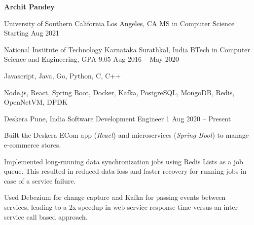 \documentclass[11pt,a4paper]{article}
\begin{document}
\begin{center}
	\textbf{\LARGE Archit Pandey}\\[1ex]
\end{center}



\headedsectionfive
{University of Southern California}
{Los Angeles, CA}
{MS in Computer Science}
{Starting Aug 2021}

\headedsectionfive
{National Institute of Technology Karnataka}
{Surathkal, India}
{BTech in Computer Science and Engineering, GPA 9.05}
{Aug 2016 -- May 2020}

\begin{circlist}
	\item Javascript, Java, Go, Python, C, C++
	\item Node.js, React, Spring Boot, Docker, Kafka, PostgreSQL, MongoDB, Redis, OpenNetVM, DPDK
\end{circlist}

\headedsection
{Deskera}
{Pune, India}
{Software Development Engineer 1}
{Aug 2020 -- Present}{
	\begin{circlist}
		\item Built the Deskera ECom app (\textit{React}) and microservices (\textit{Spring Boot}) to manage e-commerce stores.
		\item Implemented long-running data synchronization jobs using Redis Lists as a job queue. This resulted in reduced data loss and faster recovery for running jobs in case of a service failure.
		\item Used Debezium for change capture and Kafka for passing events between services, leading to a 2x speedup in web service response time versus an inter-service call based approach.
	\end{circlist}
}
\end{document}
